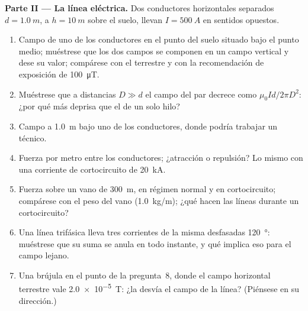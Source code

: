 \begin{problem}
\medskip
\noindent\textbf{Parte II --- La línea eléctrica.}
Dos conductores horizontales separados $d = \qty{1.0}{m}$, a $h = \qty{10}{m}$ sobre
el suelo, llevan $I = \qty{500}{A}$ en sentidos opuestos.
\begin{enumerate}[resume]
  \item Campo de uno de los conductores en el punto del suelo situado
        bajo el punto medio; muéstrese que los dos campos se componen en
        un campo vertical y dese su valor; compárese con el terrestre y
        con la recomendación de exposición de \qty{100}{\micro T}.
  \item Muéstrese que a distancias $D \gg d$ el campo del par decrece como
        $\mu_0Id/2\pi D^2$: ¿por qué más deprisa que el de un solo hilo?
  \item Campo a \qty{1.0}{m} bajo uno de los conductores, donde podría
        trabajar un técnico.
  \item Fuerza por metro entre los conductores; ¿atracción o repulsión?
        Lo mismo con una corriente de cortocircuito de \qty{20}{kA}.
  \item Fuerza sobre un vano de \qty{300}{m}, en régimen normal y en
        cortocircuito; compárese con el peso del vano (\qty{1.0}{kg/m});
        ¿qué hacen las líneas durante un cortocircuito?
  \item Una línea trifásica lleva tres corrientes de la misma 
        desfasadas \qty{120}{\degree}: muéstrese que su suma se anula en
        todo instante, y qué implica eso para el campo lejano.
  \item Una brújula en el punto de la pregunta~8, donde el campo
        horizontal terrestre vale \qty{2.0e-5}{T}: ¿la desvía el campo de
        la línea? (Piénsese en su dirección.)
\end{enumerate}


\end{problem}
